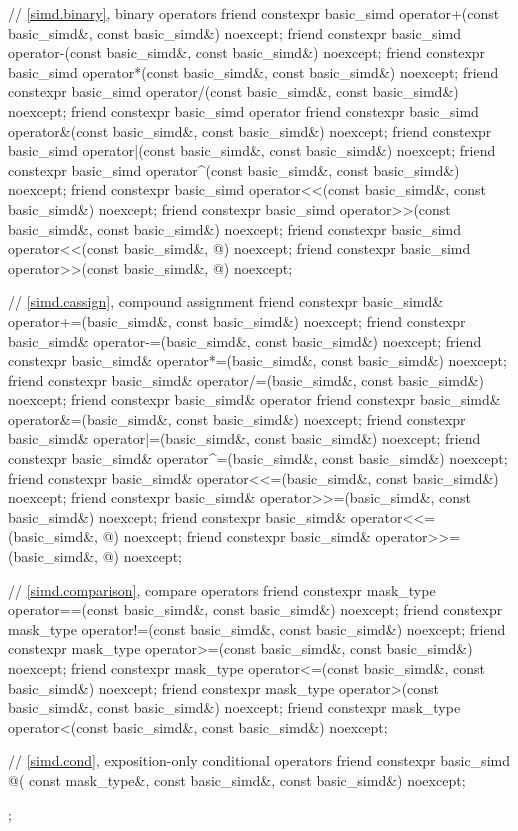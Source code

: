 \begin{codeblock}
{  // \ref{simd.binary},  binary operators
  friend constexpr basic_simd operator+(const basic_simd&, const basic_simd&) noexcept;
  friend constexpr basic_simd operator-(const basic_simd&, const basic_simd&) noexcept;
  friend constexpr basic_simd operator*(const basic_simd&, const basic_simd&) noexcept;
  friend constexpr basic_simd operator/(const basic_simd&, const basic_simd&) noexcept;
  friend constexpr basic_simd operator%
  friend constexpr basic_simd operator&(const basic_simd&, const basic_simd&) noexcept;
  friend constexpr basic_simd operator|(const basic_simd&, const basic_simd&) noexcept;
  friend constexpr basic_simd operator^(const basic_simd&, const basic_simd&) noexcept;
  friend constexpr basic_simd operator<<(const basic_simd&, const basic_simd&) noexcept;
  friend constexpr basic_simd operator>>(const basic_simd&, const basic_simd&) noexcept;
  friend constexpr basic_simd operator<<(const basic_simd&, @\simdsizetype@) noexcept;
  friend constexpr basic_simd operator>>(const basic_simd&, @\simdsizetype@) noexcept;

  // \ref{simd.cassign},  compound assignment
  friend constexpr basic_simd& operator+=(basic_simd&, const basic_simd&) noexcept;
  friend constexpr basic_simd& operator-=(basic_simd&, const basic_simd&) noexcept;
  friend constexpr basic_simd& operator*=(basic_simd&, const basic_simd&) noexcept;
  friend constexpr basic_simd& operator/=(basic_simd&, const basic_simd&) noexcept;
  friend constexpr basic_simd& operator%
  friend constexpr basic_simd& operator&=(basic_simd&, const basic_simd&) noexcept;
  friend constexpr basic_simd& operator|=(basic_simd&, const basic_simd&) noexcept;
  friend constexpr basic_simd& operator^=(basic_simd&, const basic_simd&) noexcept;
  friend constexpr basic_simd& operator<<=(basic_simd&, const basic_simd&) noexcept;
  friend constexpr basic_simd& operator>>=(basic_simd&, const basic_simd&) noexcept;
  friend constexpr basic_simd& operator<<=(basic_simd&, @\simdsizetype@) noexcept;
  friend constexpr basic_simd& operator>>=(basic_simd&, @\simdsizetype@) noexcept;

  // \ref{simd.comparison},  compare operators
  friend constexpr mask_type operator==(const basic_simd&, const basic_simd&) noexcept;
  friend constexpr mask_type operator!=(const basic_simd&, const basic_simd&) noexcept;
  friend constexpr mask_type operator>=(const basic_simd&, const basic_simd&) noexcept;
  friend constexpr mask_type operator<=(const basic_simd&, const basic_simd&) noexcept;
  friend constexpr mask_type operator>(const basic_simd&, const basic_simd&) noexcept;
  friend constexpr mask_type operator<(const basic_simd&, const basic_simd&) noexcept;

  // \ref{simd.cond},  exposition-only conditional operators
  friend constexpr basic_simd @\simdselect@(
    const mask_type&, const basic_simd&, const basic_simd&) noexcept;
};
\end{codeblock}

